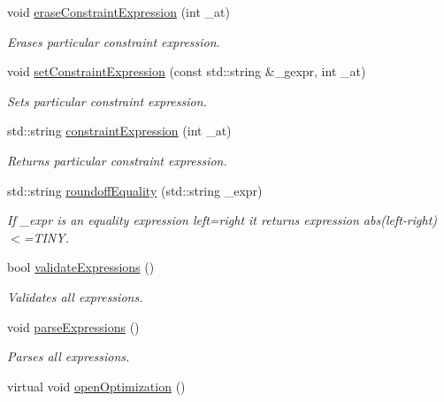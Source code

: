 \begin{DoxyCompactItemize}
void \hyperlink{class_go_s_u_m_1_1_c_parser_optimization_problem_a0413dc4ee4875ae8eedf1801769ad03e}{erase\-Constraint\-Expression} (int \-\_\-at)
\begin{DoxyCompactList}\small\item\em Erases particular constraint expression. \end{DoxyCompactList}\item 
void \hyperlink{class_go_s_u_m_1_1_c_parser_optimization_problem_a4e4a1664dc3ba561fd5d00baf76e122d}{set\-Constraint\-Expression} (const std\-::string \&\-\_\-gexpr, int \-\_\-at)
\begin{DoxyCompactList}\small\item\em Sets particular constraint expression. \end{DoxyCompactList}\item 
std\-::string \hyperlink{class_go_s_u_m_1_1_c_parser_optimization_problem_a1832758ae7eebc90862f5a430b59a819}{constraint\-Expression} (int \-\_\-at)
\begin{DoxyCompactList}\small\item\em Returns particular constraint expression. \end{DoxyCompactList}\item 
std\-::string \hyperlink{class_go_s_u_m_1_1_c_parser_optimization_problem_aaa0b8c69caf31aaef83963d2bced9bf5}{roundoff\-Equality} (std\-::string \-\_\-expr)
\begin{DoxyCompactList}\small\item\em If \-\_\-expr is an equality expression left=right it returns expression abs(left-\/right)$<$=T\-I\-N\-Y. \end{DoxyCompactList}\item 
bool \hyperlink{class_go_s_u_m_1_1_c_parser_optimization_problem_a92202addf0da14fe57311b0015296f44}{validate\-Expressions} ()
\begin{DoxyCompactList}\small\item\em Validates all expressions. \end{DoxyCompactList}\item 
void \hyperlink{class_go_s_u_m_1_1_c_parser_optimization_problem_af7f009a42704da441d1899fda94c1928}{parse\-Expressions} ()
\begin{DoxyCompactList}\small\item\em Parses all expressions. \end{DoxyCompactList}\item 
virtual void \hyperlink{class_go_s_u_m_1_1_c_parser_optimization_problem_a56ce1fd2aada271c5aece350dd9b3d03}{open\-Optimization} ()

\end{DoxyCompactItemize}
